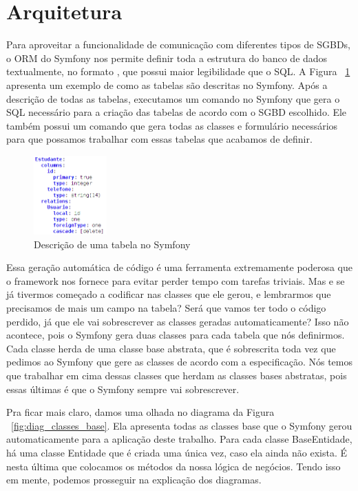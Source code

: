\section{Arquitetura}
Para aproveitar a funcionalidade de comunicação com diferentes tipos de SGBDs, o ORM
do Symfony nos permite definir toda a estrutura do banco de dados textualmente, no formato
, que possui maior legibilidade que o SQL.
A Figura ~\ref{fig:tabela_yaml} apresenta um exemplo de como as tabelas são descritas no Symfony.
Após a descrição de todas as tabelas, executamos um comando no Symfony que gera o SQL necessário
para a criação das tabelas de acordo com o SGBD escolhido. Ele também possui um comando
que gera todas as classes e formulário necessários para que possamos trabalhar com essas tabelas
que acabamos de definir.

\begin{figure}[htbp]
\centering
\includegraphics[width=0.25\textwidth]{fig/tabela_yaml.png}
\caption{Descrição de uma tabela no Symfony}
\label{fig:tabela_yaml}
\end{figure}

Essa geração automática de código é uma ferramenta extremamente poderosa que o framework nos
fornece para evitar perder tempo com tarefas triviais. Mas e se já tivermos começado a codificar
nas classes que ele gerou, e lembrarmos que precisamos de mais um campo na tabela? Será que
vamos ter todo o código perdido, já que ele vai sobrescrever as classes geradas automaticamente?
Isso não acontece, pois o Symfony gera duas classes para cada tabela que nós definirmos. Cada classe
herda de uma classe base abstrata, que é sobrescrita toda vez que pedimos ao Symfony que gere
as classes de acordo com a especificação. Nós temos que trabalhar em cima dessas classes que
herdam as classes bases abstratas, pois essas últimas é que o Symfony sempre vai sobrescrever.

Pra ficar mais claro, damos uma olhada no diagrama da Figura ~\ref{fig:diag_classes_base}. Ela
apresenta todas as classes base que o Symfony gerou automaticamente para a aplicação deste trabalho.
Para cada classe BaseEntidade, há uma classe Entidade que é criada uma única vez, caso ela ainda não
exista. É nesta última que colocamos os métodos da nossa lógica de negócios. Tendo isso em mente,
podemos prosseguir na explicação dos diagramas.

